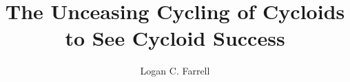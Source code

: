 \documentclass[draft, onecolumn, letterpaper, 12pt, conference]{ruthesis}
\title{The Unceasing Cycling of Cycloids to See Cycloid Success}
\author{Logan C. Farrell}
\begin{document}
  \begin{frontmatter}
   \maketitle
   
   \tableofcontents
   \listoffigures
   \listoftables
  \end{frontmatter}









\appendix




\end{document}
